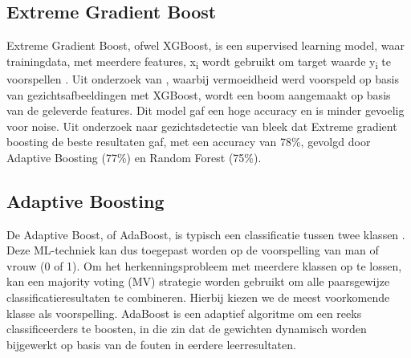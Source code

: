 \subsection{Extreme Gradient Boost}
\label{sub:xgboost}
Extreme Gradient Boost, ofwel XGBoost, is een supervised learning model, waar trainingdata, met meerdere features, x\textsubscript{i} wordt gebruikt om target waarde y\textsubscript{i} te voorspellen \autocite{XGBoost2023}. Uit onderzoek van \autocite{Chen2023}, waarbij vermoeidheid werd voorspeld op basis van gezichtsafbeeldingen met XGBoost, wordt een boom aangemaakt op basis van de geleverde features. Dit model gaf een hoge accuracy en is minder gevoelig voor noise. Uit onderzoek naar gezichtsdetectie van \textcite{Sanil2023} bleek dat Extreme gradient boosting de beste resultaten gaf, met een accuracy van 78\%, gevolgd door Adaptive Boosting (77\%) en Random Forest (75\%). 

\subsection{Adaptive Boosting}
\label{sub:adaboost}
De Adaptive Boost, of AdaBoost, is typisch een classificatie tussen twee klassen  \autocite{Guo2001}. Deze ML-techniek kan dus toegepast worden op de voorspelling van man of vrouw (0 of 1). Om het herkenningsprobleem met meerdere klassen op te lossen, kan een majority voting (MV) strategie worden gebruikt om alle paarsgewijze classificatieresultaten te combineren. Hierbij kiezen we de meest voorkomende klasse als voorspelling. AdaBoost is een adaptief algoritme om een reeks classificeerders te boosten, in die zin dat de gewichten dynamisch worden bijgewerkt op basis van de fouten in eerdere leerresultaten.


